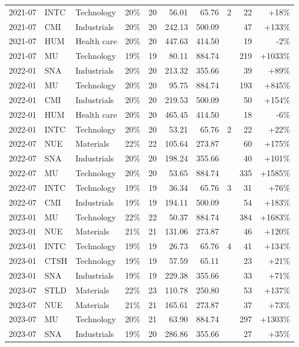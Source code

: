 \documentclass[11pt,a4paper]{article}
\begin{document}
{\begin{longtable}{l l l r r r r r r r}
2021-07 & INTC & Technology & 20\% & 20 & 56.01 & 65.76 & 2 & 22 & +18\% \\
2021-07 & CMI & Industrials & 20\% & 20 & 242.13 & 500.09 &  & 47 & +133\% \\
2021-07 & HUM & Health care & 20\% & 20 & 447.63 & 414.50 &  & 19 & -2\% \\
2021-07 & MU & Technology & 19\% & 19 & 80.11 & 884.74 &  & 219 & +1033\% \\
2022-01 & SNA & Industrials & 20\% & 20 & 213.32 & 355.66 &  & 39 & +89\% \\
2022-01 & MU & Technology & 20\% & 20 & 95.75 & 884.74 &  & 193 & +845\% \\
2022-01 & CMI & Industrials & 20\% & 20 & 219.53 & 500.09 &  & 50 & +154\% \\
2022-01 & HUM & Health care & 20\% & 20 & 465.45 & 414.50 &  & 18 & -6\% \\
2022-01 & INTC & Technology & 20\% & 20 & 53.21 & 65.76 & 2 & 22 & +22\% \\
2022-07 & NUE & Materials & 22\% & 22 & 105.64 & 273.87 &  & 60 & +175\% \\
2022-07 & SNA & Industrials & 20\% & 20 & 198.24 & 355.66 &  & 40 & +101\% \\
2022-07 & MU & Technology & 20\% & 20 & 53.65 & 884.74 &  & 335 & +1585\% \\
2022-07 & INTC & Technology & 19\% & 19 & 36.34 & 65.76 & 3 & 31 & +76\% \\
2022-07 & CMI & Industrials & 19\% & 19 & 194.11 & 500.09 &  & 54 & +183\% \\
2023-01 & MU & Technology & 22\% & 22 & 50.37 & 884.74 &  & 384 & +1683\% \\
2023-01 & NUE & Materials & 21\% & 21 & 131.06 & 273.87 &  & 46 & +120\% \\
2023-01 & INTC & Technology & 19\% & 19 & 26.73 & 65.76 & 4 & 41 & +134\% \\
2023-01 & CTSH & Technology & 19\% & 19 & 57.59 & 65.11 &  & 23 & +21\% \\
2023-01 & SNA & Industrials & 19\% & 19 & 229.38 & 355.66 &  & 33 & +71\% \\
2023-07 & STLD & Materials & 22\% & 23 & 110.78 & 250.80 &  & 53 & +137\% \\
2023-07 & NUE & Materials & 21\% & 21 & 165.61 & 273.87 &  & 37 & +73\% \\
2023-07 & MU & Technology & 20\% & 21 & 63.90 & 884.74 &  & 297 & +1303\% \\
2023-07 & SNA & Industrials & 19\% & 20 & 286.86 & 355.66 &  & 27 & +35\% \\

\end{longtable}}
\end{document}
